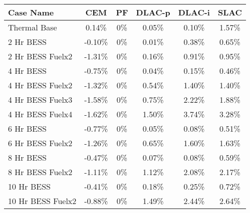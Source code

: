 \begin{tabular}{lccccc}
\toprule
Case Name & CEM & PF & DLAC-p & DLAC-i & SLAC \\
\midrule
Thermal Base & 0.14\% & 0\% & 0.05\% & 0.10\% & 1.57\% \\
2 Hr BESS & -0.10\% & 0\% & 0.01\% & 0.38\% & 0.65\% \\
2 Hr BESS Fuelx2 & -1.31\% & 0\% & 0.16\% & 0.91\% & 0.95\% \\
4 Hr BESS & -0.75\% & 0\% & 0.04\% & 0.15\% & 0.46\% \\
4 Hr BESS Fuelx2 & -1.32\% & 0\% & 0.54\% & 1.40\% & 1.40\% \\
4 Hr BESS Fuelx3 & -1.58\% & 0\% & 0.75\% & 2.22\% & 1.88\% \\
4 Hr BESS Fuelx4 & -1.62\% & 0\% & 1.50\% & 3.74\% & 3.28\% \\
6 Hr BESS & -0.77\% & 0\% & 0.05\% & 0.08\% & 0.51\% \\
6 Hr BESS Fuelx2 & -1.26\% & 0\% & 0.65\% & 1.60\% & 1.63\% \\
8 Hr BESS & -0.47\% & 0\% & 0.07\% & 0.08\% & 0.59\% \\
8 Hr BESS Fuelx2 & -1.11\% & 0\% & 1.12\% & 2.08\% & 2.17\% \\
10 Hr BESS & -0.41\% & 0\% & 0.18\% & 0.25\% & 0.72\% \\
10 Hr BESS Fuelx2 & -0.88\% & 0\% & 1.49\% & 2.44\% & 2.64\% \\
\bottomrule
\end{tabular}

